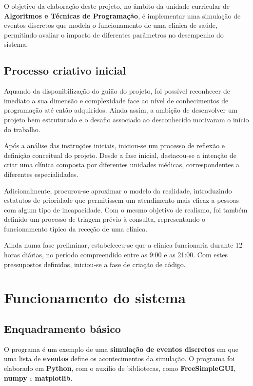 \documentclass[12pt,a4paper]{article} %
\begin{document}
    \medskip
    O objetivo da elaboração deste projeto, no âmbito da unidade curricular de  \textbf{Algoritmos e Técnicas de Programação}, é implementar uma simulação de eventos discretos que modela o funcionamento de uma clínica de saúde, permitindo avaliar o impacto de diferentes parâmetros no desempenho do sistema.

    \subsection{Processo criativo inicial}
    Aquando da disponibilização do guião do projeto, foi possível reconhecer de imediato a sua dimensão e complexidade face ao nível de conhecimentos de programação até então adquiridos. Ainda assim, a ambição de desenvolver um projeto bem estruturado e o desafio associado ao desconhecido motivaram o início do trabalho.

    \medskip
    Após a análise das instruções iniciais, iniciou-se um processo de reflexão e definição conceitual do projeto. Desde a fase inicial, destacou-se a intenção de criar uma clínica composta por diferentes unidades médicas, correspondentes a diferentes especialidades.

    \medskip
    Adicionalmente, procurou-se aproximar o modelo da realidade, introduzindo estatutos de prioridade que permitissem um atendimento mais eficaz a pessoas com algum tipo de incapacidade. Com o mesmo objetivo de realismo, foi também definido um processo de triagem prévio à consulta, representando o funcionamento típico da receção de uma clínica.

    \medskip
    Ainda numa fase preliminar, estabeleceu-se que a clínica funcionaria durante 12 horas diárias, no período compreendido entre as 9:00 e as 21:00.
    Com estes pressupostos definidos, iniciou-se a fase de criação de código.



    \newpage
\section{Funcionamento do sistema}

\subsection{Enquadramento básico}

O programa é um exemplo de uma \textbf{simulação de eventos discretos} em que uma lista de \textbf{eventos} define os acontecimentos da simulação. O programa foi elaborado em \textbf{Python}, com o auxílio de bibliotecas, como \textbf{FreeSimpleGUI}, \textbf{numpy} e \textbf{matplotlib}. 
\end{document}
